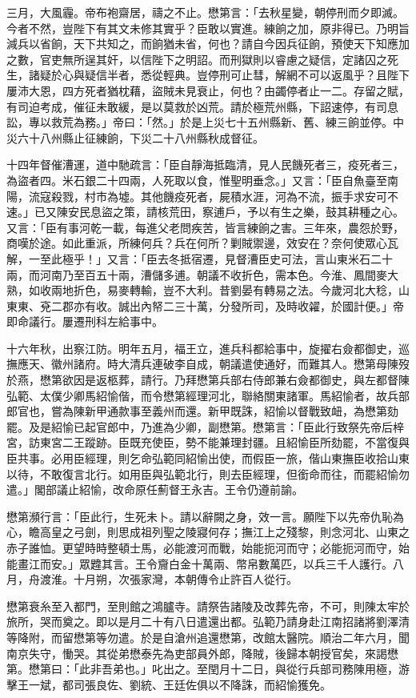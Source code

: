 \begin{pinyinscope}
三月，大風霾。帝布袍齋居，禱之不止。懋第言：「去秋星變，朝停刑而夕即滅。今者不然，豈陛下有其文未修其實乎？臣敢以實進。練餉之加，原非得已。乃明旨減兵以省餉，天下共知之，而餉猶未省，何也？請自今因兵征餉，預使天下知應加之數，官吏無所逞其奸，以信陛下之明詔。而刑獄則以睿慮之疑信，定諸囚之死生，諸疑於心與疑信半者，悉從輕典。豈停刑可止彗，解網不可以返風乎？且陛下屢沛大恩，四方死者猶枕藉，盜賊未見衰止，何也？由蠲停者止一二。存留之賦，有司迫考成，催征未敢緩，是以莫救於凶荒。請於極荒州縣，下詔速停，有司息訟，專以救荒為務。」帝曰：「然。」於是上災七十五州縣新、舊、練三餉並停。中災六十八州縣止征練餉，下災二十八州縣秋成督征。

十四年督催漕運，道中馳疏言：「臣自靜海抵臨清，見人民饑死者三，疫死者三，為盜者四。米石銀二十四兩，人死取以食，惟聖明垂念。」又言：「臣自魚臺至南陽，流寇殺戮，村市為墟。其他饑疫死者，屍積水涯，河為不流，振手求安可不速。」已又陳安民息盜之策，請核荒田，察逋戶，予以有生之樂，鼓其耕種之心。又言：「臣有事河乾一載，每進父老問疾苦，皆言練餉之害。三年來，農怨於野，商嘆於途。如此重派，所練何兵？兵在何所？剿賊禦邊，效安在？奈何使眾心瓦解，一至此極乎！」又言：「臣去冬抵宿遷，見督漕臣史可法，言山東米石二十兩，而河南乃至百五十兩，漕儲多逋。朝議不收折色，需本色。今淮、鳳間麥大熟，如收兩地折色，易麥轉輸，豈不大利。昔劉晏有轉易之法。今歲河北大稔，山東東、兗二郡亦有收。誠出內帑二三十萬，分發所司，及時收糴，於國計便。」帝即命議行。屢遷刑科左給事中。

十六年秋，出察江防。明年五月，福王立，進兵科都給事中，旋擢右僉都御史，巡撫應天、徽州諸府。時大清兵連破李自成，朝議遣使通好，而難其人。懋第母陳歿於燕，懋第欲因是返柩葬，請行。乃拜懋第兵部右侍郎兼右僉都御史，與左都督陳弘範、太僕少卿馬紹愉偕，而令懋第經理河北，聯絡關東諸軍。馬紹愉者，故兵部郎官也，嘗為陳新甲通款事至義州而還。新甲既誅，紹愉以督戰致衄，為懋第劾罷。及是紹愉已起官郎中，乃進為少卿，副懋第。懋第言：「臣此行致祭先帝后梓宮，訪東宮二王蹤跡。臣既充使臣，勢不能兼理封疆。且紹愉臣所劾罷，不當復與臣共事。必用臣經理，則乞命弘範同紹愉出使，而假臣一旅，偕山東撫臣收拾山東以待，不敢復言北行。如用臣與弘範北行，則去臣經理，但銜命而往，而罷紹愉勿遣。」閣部議止紹愉，改命原任薊督王永吉。王令仍遵前諭。

懋第瀕行言：「臣此行，生死未卜。請以辭闕之身，效一言。願陛下以先帝仇恥為心，瞻高皇之弓劍，則思成祖列聖之陵寢何存；撫江上之殘黎，則念河北、山東之赤子誰恤。更望時時整頓士馬，必能渡河而戰，始能扼河而守；必能扼河而守，始能畫江而安。」眾韙其言。王令齎白金十萬兩、幣帛數萬匹，以兵三千人護行。八月，舟渡淮。十月朔，次張家灣，本朝傳令止許百人從行。

懋第衰糸至入都門，至則館之鴻臚寺。請祭告諸陵及改葬先帝，不可，則陳太牢於旅所，哭而奠之。即以是月二十有八日遣還出都。弘範乃請身赴江南招諸將劉澤清等降附，而留懋第等勿遣。於是自滄州追還懋第，改館太醫院。順治二年六月，聞南京失守，慟哭。其從弟懋泰先為吏部員外郎，降賊，後歸本朝授官矣，來謁懋第。懋第曰：「此非吾弟也。」叱出之。至閏月十二日，與從行兵部司務陳用極，游擊王一斌，都司張良佐、劉統、王廷佐俱以不降誅，而紹愉獲免。


\end{pinyinscope}
